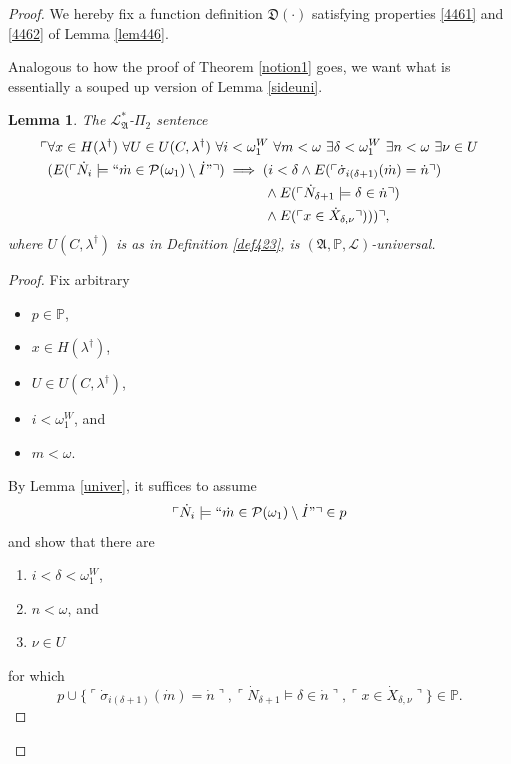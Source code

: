 \documentclass[12pt, twoside]{memoir}
\numberwithin{equation}{section}
\newtheorem{lem}[thm]{Lemma}
\theoremstyle{definition}
\theoremstyle{remark}
\theoremstyle{definition}
\theoremstyle{definition}
\theoremstyle{definition}
\theoremstyle{remark}
\begin{document}
\begin{proof}
We hereby fix a function definition $\mathfrak{D}(\cdot)$ satisfying properties \ref{4461} and \ref{4462} of Lemma \ref{lem446}.

Analogous to how the proof of Theorem \ref{notion1} goes, we want what is essentially a souped up version of Lemma \ref{sideuni}.

\begin{lem}\label{lem452}
The $\mathcal{L}^*_{\mathfrak{A}}$-$\Pi_2$ sentence 
\begin{align}\label{eq4.4}
\begin{split}
    \ulcorner & \forall x \in H(\lambda^{\dagger}) \ \forall U \in U(C, \lambda^{\dagger}) \ \forall i < \omega_1^W \ \forall m < \omega \ \exists \delta < \omega_1^W \ \exists n < \omega \ \exists \nu \in U \\ 
    & (E(\ulcorner \dot{N}_i \models ``\dot{m} \in \mathcal{P}(\omega_1) \setminus \dot{I}" \urcorner) \implies (i < \delta \wedge E(\ulcorner \dot{\sigma}_{i(\delta + 1)}(\dot{m}) = \dot{n} \urcorner) \\
    & \mspace{279mu} \wedge E(\ulcorner \dot{N}_{\delta + 1} \models \delta \in \dot{n} \urcorner) \\
    & \mspace{279mu} \wedge E(\ulcorner x \in \dot{X}_{\delta, \nu} \urcorner))) \urcorner \text{,}
\end{split}
\end{align}
where $U(C, \lambda^{\dagger})$ is as in Definition \ref{def423}, is $(\mathfrak{A}, \mathbb{P}, \mathcal{L})$-universal.
\end{lem}

\begin{proof}
Fix arbitrary
\begin{itemize}
    \item $p \in \mathbb{P}$,
    \item $x \in H(\lambda^{\dagger})$,
    \item $U \in U(C, \lambda^{\dagger})$,
    \item $i < \omega_1^W$, and
    \item $m < \omega$.
\end{itemize}
By Lemma \ref{univer}, it suffices to assume 
\begin{equation}\label{eq4.5}
    \ulcorner \dot{N}_i \models ``\dot{m} \in \mathcal{P}(\omega_1) \setminus \dot{I}" \urcorner \in p
\end{equation}
and show that there are 
\begin{enumerate}[label=(\Alph*)]
    \item $i < \delta < \omega_1^W$,
    \item $n < \omega$, and
    \item $\nu \in U$
\end{enumerate} 
for which 
\begin{equation*}
    p \cup \{\ulcorner \dot{\sigma}_{i(\delta + 1)}(\dot{m}) = \dot{n} \urcorner, \ulcorner \dot{N}_{\delta + 1} \models \delta \in \dot{n} \urcorner, \ulcorner x \in \dot{X}_{\delta, \nu} \urcorner\} \in \mathbb{P} \text{.}
\end{equation*}


\end{proof}
\end{proof}
\end{document}
